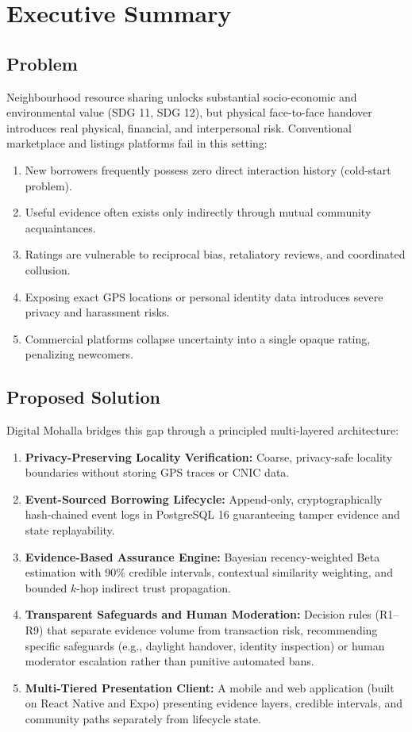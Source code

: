 \chapter*{Executive Summary}

\section*{Problem}
Neighbourhood resource sharing unlocks substantial socio-economic and environmental value (SDG 11, SDG 12), but physical face-to-face handover introduces real physical, financial, and interpersonal risk. Conventional marketplace and listings platforms fail in this setting:
\begin{enumerate}
    \item New borrowers frequently possess zero direct interaction history (cold-start problem).
    \item Useful evidence often exists only indirectly through mutual community acquaintances.
    \item Ratings are vulnerable to reciprocal bias, retaliatory reviews, and coordinated collusion.
    \item Exposing exact GPS locations or personal identity data introduces severe privacy and harassment risks.
    \item Commercial platforms collapse uncertainty into a single opaque rating, penalizing newcomers.
\end{enumerate}

\section*{Proposed Solution}
Digital Mohalla bridges this gap through a principled multi-layered architecture:
\begin{enumerate}
    \item \textbf{Privacy-Preserving Locality Verification:} Coarse, privacy-safe locality boundaries without storing GPS traces or CNIC data.
    \item \textbf{Event-Sourced Borrowing Lifecycle:} Append-only, cryptographically hash-chained event logs in PostgreSQL 16 guaranteeing tamper evidence and state replayability.
    \item \textbf{Evidence-Based Assurance Engine:} Bayesian recency-weighted Beta estimation with 90\% credible intervals, contextual similarity weighting, and bounded $k$-hop indirect trust propagation.
    \item \textbf{Transparent Safeguards and Human Moderation:} Decision rules (R1--R9) that separate evidence volume from transaction risk, recommending specific safeguards (e.g., daylight handover, identity inspection) or human moderator escalation rather than punitive automated bans.
    \item \textbf{Multi-Tiered Presentation Client:} A mobile and web application (built on React Native and Expo) presenting evidence layers, credible intervals, and community paths separately from lifecycle state.
\end{enumerate}

